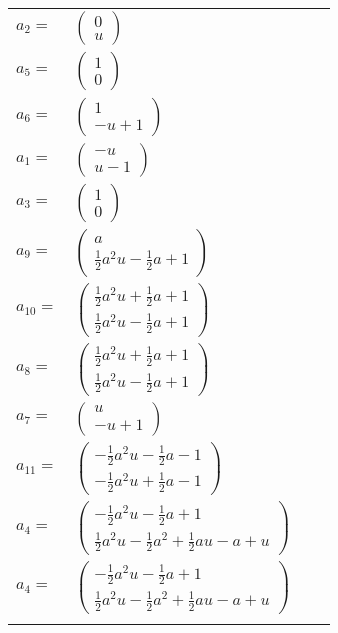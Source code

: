 \documentclass[1p]{elsarticle_modified}
\theoremstyle{definition}
\begin{document}
\begin{tabular}{m{7pt} m{180pt} m{7pt} m{180pt} }
\flushright $a_{2}=$&$\begin{pmatrix}0\\u\end{pmatrix}$ \\
\flushright $a_{5}=$&$\begin{pmatrix}1\\0\end{pmatrix}$ \\
\flushright $a_{6}=$&$\begin{pmatrix}1\\- u+1\end{pmatrix}$ \\
\flushright $a_{1}=$&$\begin{pmatrix}- u\\u-1\end{pmatrix}$ \\
\flushright $a_{3}=$&$\begin{pmatrix}1\\0\end{pmatrix}$ \\
\flushright $a_{9}=$&$\begin{pmatrix}a\\\frac{1}{2} a^2 u-\frac{1}{2} a+1\end{pmatrix}$ \\
\flushright $a_{10}=$&$\begin{pmatrix}\frac{1}{2} a^2 u+\frac{1}{2} a+1\\\frac{1}{2} a^2 u-\frac{1}{2} a+1\end{pmatrix}$ \\
\flushright $a_{8}=$&$\begin{pmatrix}\frac{1}{2} a^2 u+\frac{1}{2} a+1\\\frac{1}{2} a^2 u-\frac{1}{2} a+1\end{pmatrix}$ \\
\flushright $a_{7}=$&$\begin{pmatrix}u\\- u+1\end{pmatrix}$ \\
\flushright $a_{11}=$&$\begin{pmatrix}-\frac{1}{2} a^2 u-\frac{1}{2} a-1\\-\frac{1}{2} a^2 u+\frac{1}{2} a-1\end{pmatrix}$ \\
\flushright $a_{4}=$&$\begin{pmatrix}-\frac{1}{2} a^2 u-\frac{1}{2} a+1\\\frac{1}{2} a^2 u-\frac{1}{2} a^2+\frac{1}{2} a u- a+u\end{pmatrix}$\\ \flushright $a_{4}=$&$\begin{pmatrix}-\frac{1}{2} a^2 u-\frac{1}{2} a+1\\\frac{1}{2} a^2 u-\frac{1}{2} a^2+\frac{1}{2} a u- a+u\end{pmatrix}$\\&\end{tabular}
\end{document}
